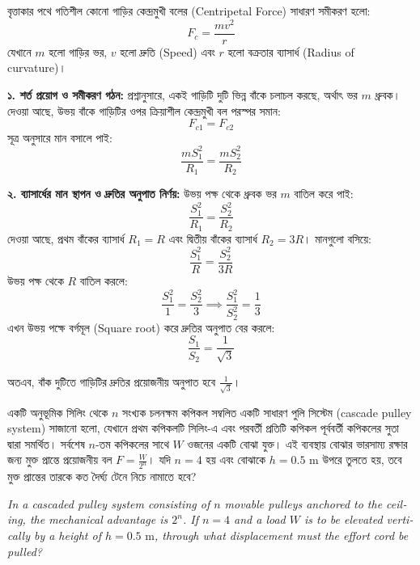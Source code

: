 \documentclass[12pt, a4paper]{article}
\begin{document}
{%
\begin{tcolorbox}[solutionbox={সমাধান (Solution)}]
\noindent
বৃত্তাকার পথে গতিশীল কোনো গাড়ির কেন্দ্রমুখী বলের (Centripetal Force) সাধারণ সমীকরণ হলো:
$$F_c = \frac{m v^2}{r}$$
যেখানে $m$ হলো গাড়ির ভর, $v$ হলো দ্রুতি (Speed) এবং $r$ হলো বক্রতার ব্যাসার্ধ (Radius of curvature)।

\vspace{0.5em}
\textbf{১. শর্ত প্রয়োগ ও সমীকরণ গঠন:}
প্রশ্নানুসারে, একই গাড়িটি দুটি ভিন্ন বাঁকে চলাচল করছে, অর্থাৎ ভর $m$ ধ্রুবক। 
দেওয়া আছে, উভয় বাঁকে গাড়িটির ওপর ক্রিয়াশীল কেন্দ্রমুখী বল পরস্পর সমান:
$$F_{c1} = F_{c2}$$
সূত্র অনুসারে মান বসালে পাই:
$$\frac{m S_1^2}{R_1} = \frac{m S_2^2}{R_2}$$

\vspace{0.5em}
\textbf{২. ব্যাসার্ধের মান স্থাপন ও দ্রুতির অনুপাত নির্ণয়:}
উভয় পক্ষ থেকে ধ্রুবক ভর $m$ বাতিল করে পাই:
$$\frac{S_1^2}{R_1} = \frac{S_2^2}{R_2}$$
দেওয়া আছে, প্রথম বাঁকের ব্যাসার্ধ $R_1 = R$ এবং দ্বিতীয় বাঁকের ব্যাসার্ধ $R_2 = 3R$। মানগুলো বসিয়ে:
$$\frac{S_1^2}{R} = \frac{S_2^2}{3R}$$
উভয় পক্ষ থেকে $R$ বাতিল করলে:
$$\frac{S_1^2}{1} = \frac{S_2^2}{3} \implies \frac{S_1^2}{S_2^2} = \frac{1}{3}$$
এখন উভয় পক্ষে বর্গমূল (Square root) করে দ্রুতির অনুপাত বের করলে:
$$\frac{S_1}{S_2} = \frac{1}{\sqrt{3}}$$

অতএব, বাঁক দুটিতে গাড়িটির দ্রুতির প্রয়োজনীয় অনুপাত হবে $\frac{1}{\sqrt{3}}$।
\end{tcolorbox}
\vspace{1em}

\begin{tcolorbox}[questionbox={প্রশ্ন (Question) 49}]
\noindent
একটি অনুভূমিক সিলিং থেকে $n$ সংখ্যক চলনক্ষম কপিকল সম্বলিত একটি সাধারণ পুলি সিস্টেম (cascade pulley system) সাজানো হলো, যেখানে প্রথম কপিকলটি সিলিং-এ এবং পরবর্তী প্রতিটি কপিকল পূর্ববর্তী কপিকলের সুতা দ্বারা সমর্থিত। সর্বশেষ $n$-তম কপিকলের সাথে $W$ ওজনের একটি বোঝা যুক্ত। এই ব্যবস্থায় বোঝার ভারসাম্য রক্ষার জন্য মুক্ত প্রান্তে প্রয়োজনীয় বল $F = \frac{W}{2^n}$। যদি $n = 4$ হয় এবং বোঝাকে $h = 0.5\text{ m}$ উপরে তুলতে হয়, তবে মুক্ত প্রান্তের তারকে কত দৈর্ঘ্য টেনে নিচে নামাতে হবে?

\vspace{0.8em}
\begin{english}
\noindent\textit{\color{darkgray}
In a cascaded pulley system consisting of $n$ movable pulleys anchored to the ceiling, the mechanical advantage is $2^n$. If $n = 4$ and a load $W$ is to be elevated vertically by a height of $h = 0.5\text{ m}$, through what displacement must the effort cord be pulled?
}
\end{english}
\end{tcolorbox}

}
\end{document}
